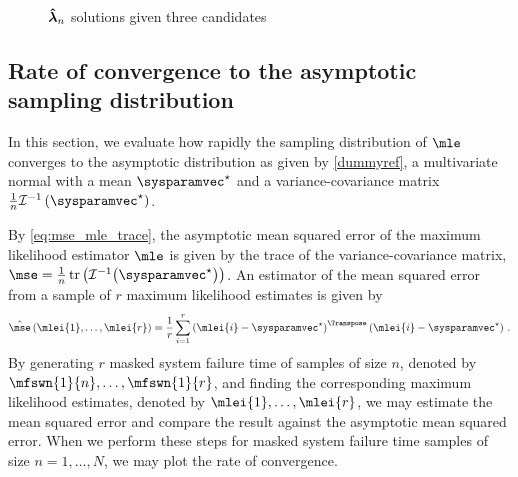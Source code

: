 \documentclass[../main.tex]{subfiles}
\begin{document}
\begin{figure}
\caption{$\boldsymbol{\hat{\lambda}}_n$ solutions given three candidates}
\label{fig:plane_sol}
\centering
{}
\end{figure}

\subsection{Rate of convergence to the asymptotic sampling distribution}
In this section, we evaluate how rapidly the sampling distribution of $\mle$ 
converges to the asymptotic distribution as given by \cref{dummyref}, a 
multivariate normal with a mean $\tparam\sysparamvec$ and a variance-covariance 
matrix $\frac{1}{n} \infomatrx^{-1}\left(\tparam\sysparamvec\right)$.

By \cref{eq:mse_mle_trace}, the asymptotic mean squared error of the maximum likelihood estimator $\mle$ is given by the trace of the variance-covariance matrix, $\mse = \frac{1}{n} \trace \left ( \infomatrx^{-1} \bigl(\tparam\sysparamvec\bigr) \right)$. An estimator of the mean squared error from a sample of $r$ maximum likelihood estimates is given by
\begin{equation}
\estimator{\mse}\left(\mlei{1}, \ldots, \mlei{r}\right) = \frac{1}{r} 
\sum_{i=1}^{r} \left( \mlei{i} - \tparam\sysparamvec \right)^\Transpose \left( 
\mlei{i} - \tparam\sysparamvec \right)\,.
\end{equation}
By generating $r$ masked system failure time of samples of size $n$, denoted by $\mfswn{1}{n}, \ldots, \mfswn{1}{r}$, and finding the corresponding maximum likelihood estimates, denoted by $\mlei{1}, \ldots, \mlei{r}$, we may estimate the mean squared error and compare the result against the asymptotic mean squared error. When we perform these steps for masked system failure time samples of size $n = 1,\ldots, N$, we may plot the rate of convergence.
\end{document}
